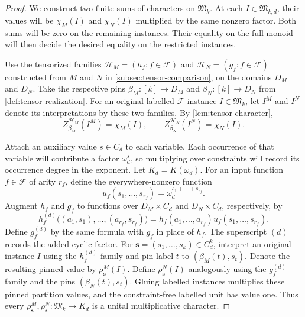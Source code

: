 \documentclass[11pt,letterpaper,onecolumn]{article}
\theoremstyle{plain}
\theoremstyle{definition}
\theoremstyle{remark}
\newcommand{\cF}{\mathcal F}
\newcommand{\InstMonoid}[1]{\mathfrak M_{#1}}
\begin{document}
\begin{proof}
We construct two finite sums of characters on $\InstMonoid{k}$.
At each $I\in\mathfrak M_{k,d}$, their values will be $\chi_M(I)$ and
$\chi_N(I)$ multiplied by the same nonzero factor.  Both sums will be zero
on the remaining instances.  Their equality on the full monoid will then
decide the desired equality on the restricted instances.

Use the tensorized families
$\mathcal H_M=(h_f:f\in\cF)$ and $\mathcal H_N=(g_f:f\in\cF)$
constructed from $M$ and $N$ in \cref{subsec:tensor-comparison}, on the
domains $D_M$ and $D_N$.  Take the respective pins
$\beta_M:[k]\to D_M$ and $\beta_N:[k]\to D_N$ from
\cref{def:tensor-realization}.  For an
original labelled $\cF$-instance $I\in\InstMonoid{k}$, let $I^M$
and $I^N$ denote its interpretations by these two families.  By
\cref{lem:tensor-character},
\begin{equation}
  Z_{\beta_M}^{\mathcal H_M}(I^M)=\chi_M(I),
  \qquad
  Z_{\beta_N}^{\mathcal H_N}(I^N)=\chi_N(I).
  \label{eq:degree-filter-monomial-realizations}
\end{equation}

Attach an auxiliary value $s\in C_d$ to each variable.  Each occurrence
of that variable will contribute a factor $\omega_d^s$, so multiplying
over constraints will record its occurrence degree in the exponent.
Let $K_d=K(\omega_d)$.  For an input function $f\in\cF$ of arity $r_f$,
define the everywhere-nonzero function
\begin{equation*}
  u_f(s_1,\ldots,s_{r_f})
  =\omega_d^{s_1+\cdots+s_{r_f}}.
\end{equation*}
Augment $h_f$ and $g_f$ to functions over
$D_M\times C_d$ and $D_N\times C_d$, respectively, by
\begin{equation*}
  h_f^{(d)}\bigl((a_1,s_1),\ldots,(a_{r_f},s_{r_f})\bigr)
  =h_f(a_1,\ldots,a_{r_f})u_f(s_1,\ldots,s_{r_f}).
\end{equation*}
Define $g_f^{(d)}$ by the same formula with $g_f$ in place of $h_f$.
The superscript $(d)$ records the added cyclic factor.
For $\mathbf s=(s_1,\ldots,s_k)\in C_d^k$, interpret an original
instance $I$ using the $h_f^{(d)}$-family and pin label $t$ to
$(\beta_M(t),s_t)$.  Denote the resulting pinned value by $\rho^M_{\mathbf s}(I)$. Define $\rho^N_{\mathbf s}(I)$ analogously using the $g_f^{(d)}$-family
and the pins $(\beta_N(t),s_t)$.  Gluing labelled instances multiplies
these pinned partition values, and the constraint-free labelled unit has
value one.  Thus every $\rho^M_{\mathbf s},\rho^N_{\mathbf s}:\InstMonoid{k}\to K_d$
is a unital multiplicative character.


\end{proof}
\end{document}
